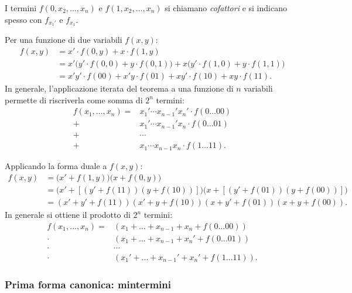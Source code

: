 \documentclass[11pt,a4paper]{article}
\begin{document}
I termini $f(0, x_2, \dots, x_n)$ e $f(1, x_2, \dots, x_n)$ si chiamano
\emph{cofattori} e si indicano spesso con $f_{x_1'}$ e $f_{x_1}$.

\begin{esempio}
Per una funzione di due variabili $f(x,y)$:
\begin{align*}
f(x,y) &= x' \cdot f(0,y) + x \cdot f(1,y)\\
       &= x' \bigl(y' \cdot f(0,0) + y \cdot f(0,1)\bigr)
          + x \bigl(y' \cdot f(1,0) + y \cdot f(1,1)\bigr)\\
       &= x'y' \cdot f(00) + x'y \cdot f(01) + xy' \cdot f(10) + xy \cdot f(11).
\end{align*}
In generale, l'applicazione iterata del teorema a una funzione di $n$ variabili
permette di riscriverla come somma di $2^n$ termini:
\begin{align*}
f(x_1,\dots,x_n) = {}& x_1' \cdots x_{n-1}' x_n' \cdot f(0\dots00)\\
 + {}& x_1' \cdots x_{n-1}' x_n \cdot f(0\dots01)\\
 + {}& \cdots\\
 + {}& x_1 \cdots x_{n-1} x_n \cdot f(1\dots11).
\end{align*}
\end{esempio}

\begin{esempio}
Applicando la forma duale a $f(x,y)$:
\begin{align*}
f(x,y) &= \bigl(x' + f(1,y)\bigr)\bigl(x + f(0,y)\bigr)\\
       &= \bigl(x' + [(y' + f(11))(y + f(10))]\bigr)
          \bigl(x + [(y' + f(01))(y + f(00))]\bigr)\\
       &= (x' + y' + f(11))(x' + y + f(10))(x + y' + f(01))(x + y + f(00)).
\end{align*}
In generale si ottiene il prodotto di $2^n$ termini:
\begin{align*}
f(x_1,\dots,x_n) = {}& (x_1 + \dots + x_{n-1} + x_n + f(0\dots00))\\
 \cdot {}& (x_1 + \dots + x_{n-1} + x_n' + f(0\dots01))\\
 \cdot {}& \cdots\\
 \cdot {}& (x_1' + \dots + x_{n-1}' + x_n' + f(1\dots11)).
\end{align*}
\end{esempio}

\subsubsection{Prima forma canonica: mintermini}
\end{document}
